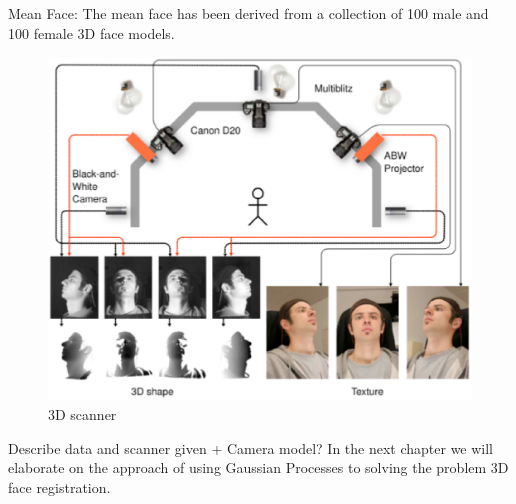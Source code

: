 Mean Face:
The mean face has been derived from a collection of 100 male and 100 female 3D face models.
\begin{figure}
\centering
\includegraphics[width=\textwidth]{./resources/figures/scanner.eps}
\caption{3D scanner}
\label{fig:scanner}
\end{figure}
Describe data and scanner given + Camera model?
In the next chapter we will elaborate on the approach of using Gaussian Processes to solving the problem 3D face registration.

\nopagebreak



